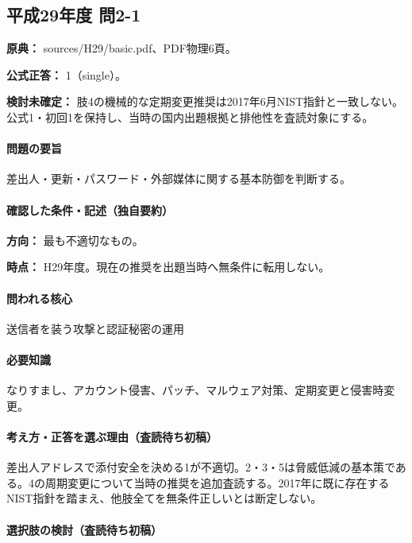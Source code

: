 \subsection{平成29年度 問2-1}
\label{q:h29-reg-basic-2-1}

\noindent\textbf{原典：} sources/H29/basic.pdf、PDF物理6頁。

\textbf{公式正答：} 1（single）。

\par\textbf{検討未確定：} 肢4の機械的な定期変更推奨は2017年6月NIST指針と一致しない。公式1・初回1を保持し、当時の国内出題根拠と排他性を査読対象にする。

\paragraph{問題の要旨} 差出人・更新・パスワード・外部媒体に関する基本防御を判断する。

\paragraph{確認した条件・記述（独自要約）}\mbox{}\par

\noindent\textbf{方向：} 最も不適切なもの。\par

\noindent\textbf{時点：} H29年度。現在の推奨を出題当時へ無条件に転用しない。\par

\paragraph{問われる核心} 送信者を装う攻撃と認証秘密の運用

\paragraph{必要知識} なりすまし、アカウント侵害、パッチ、マルウェア対策、定期変更と侵害時変更。

\paragraph{考え方・正答を選ぶ理由（査読待ち初稿）} 差出人アドレスで添付安全を決める1が不適切。2・3・5は脅威低減の基本策である。4の周期変更について当時の推奨を追加査読する。2017年に既に存在するNIST指針を踏まえ、他肢全てを無条件正しいとは断定しない。

\paragraph{選択肢の検討（査読待ち初稿）}\mbox{}\par

